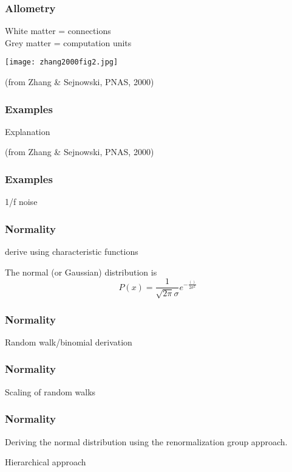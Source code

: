\begin{frame}
  \frametitle{Allometry}

White matter = connections\\
Grey matter = computation units

\begin{center}
\texttt{[image: zhang2000fig2.jpg]}  
\end{center}

\hfill{\tiny(from Zhang \& Sejnowski, PNAS, 2000)}

\end{frame}

\begin{frame}
  \frametitle{Examples}

Explanation

\hfill{\tiny(from Zhang \& Sejnowski, PNAS, 2000)}


\end{frame}

\begin{frame}
  \frametitle{Examples}

1/f noise

\end{frame}


\begin{comment}

percolation

\end{comment}



\begin{frame}
  \frametitle{Normality}

  derive using characteristic functions

  The normal (or Gaussian) distribution is
  $$
  P(x) 
  =
  \frac{1}{\sqrt{2\pi}\sigma}
  e^{-\frac{()}{2\sigma^2}}
  $$

\end{frame}

\begin{frame}
  \frametitle{Normality}

  Random walk/binomial derivation


\end{frame}

\begin{frame}
  \frametitle{Normality}

  Scaling of random walks

\end{frame}

\begin{frame}
  \frametitle{Normality}

  Deriving the normal distribution using 
  the renormalization group approach.

  Hierarchical approach

\end{frame}

